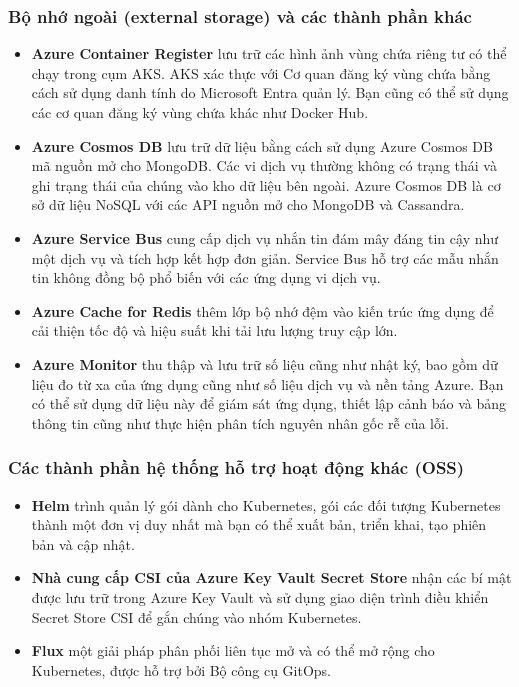 \subsubsection{Bộ nhớ ngoài (external storage) và các thành phần khác}
\begin{itemize}
    \item \textbf{Azure Container Register} lưu trữ các hình ảnh vùng chứa riêng tư có thể chạy trong cụm AKS. AKS xác thực với Cơ quan đăng ký vùng chứa bằng cách sử dụng danh tính do Microsoft Entra quản lý. Bạn cũng có thể sử dụng các cơ quan đăng ký vùng chứa khác như Docker Hub.
    \item \textbf{Azure Cosmos DB} lưu trữ dữ liệu bằng cách sử dụng Azure Cosmos DB mã nguồn mở cho MongoDB. Các vi dịch vụ thường không có trạng thái và ghi trạng thái của chúng vào kho dữ liệu bên ngoài. Azure Cosmos DB là cơ sở dữ liệu NoSQL với các API nguồn mở cho MongoDB và Cassandra.
    \item \textbf{Azure Service Bus} cung cấp dịch vụ nhắn tin đám mây đáng tin cậy như một dịch vụ và tích hợp kết hợp đơn giản. Service Bus hỗ trợ các mẫu nhắn tin không đồng bộ phổ biến với các ứng dụng vi dịch vụ.
    \item \textbf{Azure Cache for Redis} thêm lớp bộ nhớ đệm vào kiến trúc ứng dụng để cải thiện tốc độ và hiệu suất khi tải lưu lượng truy cập lớn.
    \item \textbf{Azure Monitor} thu thập và lưu trữ số liệu cũng như nhật ký, bao gồm dữ liệu đo từ xa của ứng dụng cũng như số liệu dịch vụ và nền tảng Azure. Bạn có thể sử dụng dữ liệu này để giám sát ứng dụng, thiết lập cảnh báo và bảng thông tin cũng như thực hiện phân tích nguyên nhân gốc rễ của lỗi. 
\end{itemize}
\subsubsection{Các thành phần hệ thống hỗ trợ hoạt động khác (OSS)}
\begin{itemize}
    \item \textbf{Helm} trình quản lý gói dành cho Kubernetes, gói các đối tượng Kubernetes thành một đơn vị duy nhất mà bạn có thể xuất bản, triển khai, tạo phiên bản và cập nhật.
    \item \textbf{Nhà cung cấp CSI của Azure Key Vault Secret Store} nhận các bí mật được lưu trữ trong Azure Key Vault và sử dụng giao diện trình điều khiển Secret Store CSI để gắn chúng vào nhóm Kubernetes. 
    \item \textbf{Flux} một giải pháp phân phối liên tục mở và có thể mở rộng cho Kubernetes, được hỗ trợ bởi Bộ công cụ GitOps.
\end{itemize}
